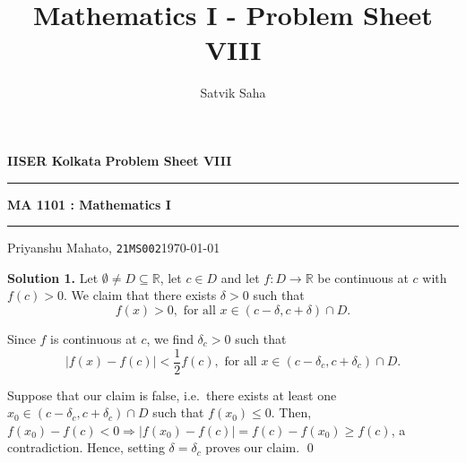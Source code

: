 \documentclass[10pt]{article}
\title{Mathematics I - Problem Sheet VIII}
\author{Satvik Saha}
\date{}
\begin{document}
	\par\textbf{IISER Kolkata} \hfill \textbf{Problem Sheet VIII}
	\vspace{3pt}
	\hrule
	\vspace{3pt}
	\begin{center}
		\LARGE{\textbf{MA 1101 : Mathematics I}}
	\end{center}
	\vspace{3pt}
	\hrule
	\vspace{3pt}
	Priyanshu Mahato, \texttt{21MS002}\hfill\today
	\vspace{20pt}
	
	\textbf{Solution 1.}
	Let $\emptyset \neq D \subseteq \mathbb{R}$, let $c \in D$ and let $f\colon D \to \mathbb{R}$ be continuous at $c$ with $f(c) > 0$.
	We claim that there exists $\delta > 0$ such that \[f(x) > 0, \text{ for all } x \in (c - \delta, c + \delta) \cap D.\]
	
	Since $f$ is continuous at $c$, we find $\delta_c > 0$ such that
	\[|f(x) - f(c)| < \frac{1}{2}f(c), \text{ for all } x \in (c - \delta_c, c + \delta_c) \cap D.\]
	
	Suppose that our claim is false, i.e.\ there exists at least one $x_0 \in (c - \delta_c, c + \delta_c) \cap D$ such that $f(x_0) \le 0$.
	Then, $f(x_0) - f(c) < 0 \Rightarrow |f(x_0) - f(c)| = f(c) - f(x_0) \ge f(c)$, a contradiction.
	Hence, setting $\delta = \delta_c$ proves our claim. \qed\\
	
\end{document}
